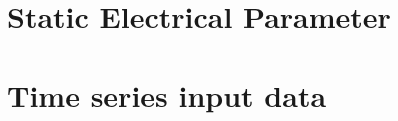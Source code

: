 \documentclass{article}
\begin{document}

\section{Static Electrical Parameter}
\label{sec:format_spec}



\section{Time series input data}

\end{document}
